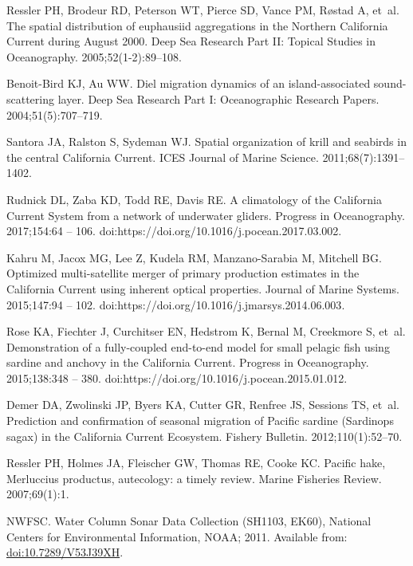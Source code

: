 \documentclass[10pt,letterpaper]{article}
\begin{document}
\begin{thebibliography}{10}
Ressler PH, Brodeur RD, Peterson WT, Pierce SD, Vance PM, R{\o}stad A, et~al.
\newblock The spatial distribution of euphausiid aggregations in the Northern
  California Current during August 2000.
\newblock Deep Sea Research Part II: Topical Studies in Oceanography.
  2005;52(1-2):89--108.

Benoit-Bird KJ, Au WW.
\newblock Diel migration dynamics of an island-associated sound-scattering
  layer.
\newblock Deep Sea Research Part I: Oceanographic Research Papers.
  2004;51(5):707--719.

Santora JA, Ralston S, Sydeman WJ.
\newblock Spatial organization of krill and seabirds in the central California
  Current.
\newblock ICES Journal of Marine Science. 2011;68(7):1391--1402.

Rudnick DL, Zaba KD, Todd RE, Davis RE.
\newblock A climatology of the California Current System from a network of
  underwater gliders.
\newblock Progress in Oceanography. 2017;154:64 -- 106.
\newblock doi:{https://doi.org/10.1016/j.pocean.2017.03.002}.

Kahru M, Jacox MG, Lee Z, Kudela RM, Manzano-Sarabia M, Mitchell BG.
\newblock Optimized multi-satellite merger of primary production estimates in
  the California Current using inherent optical properties.
\newblock Journal of Marine Systems. 2015;147:94 -- 102.
\newblock doi:{https://doi.org/10.1016/j.jmarsys.2014.06.003}.

Rose KA, Fiechter J, Curchitser EN, Hedstrom K, Bernal M, Creekmore S, et~al.
\newblock Demonstration of a fully-coupled end-to-end model for small pelagic
  fish using sardine and anchovy in the California Current.
\newblock Progress in Oceanography. 2015;138:348 -- 380.
\newblock doi:{https://doi.org/10.1016/j.pocean.2015.01.012}.

Demer DA, Zwolinski JP, Byers KA, Cutter GR, Renfree JS, Sessions TS, et~al.
\newblock Prediction and confirmation of seasonal migration of Pacific sardine
  (Sardinops sagax) in the California Current Ecosystem.
\newblock Fishery Bulletin. 2012;110(1):52--70.

Ressler PH, Holmes JA, Fleischer GW, Thomas RE, Cooke KC.
\newblock Pacific hake, Merluccius productus, autecology: a timely review.
\newblock Marine Fisheries Review. 2007;69(1):1.

NWFSC. Water Column Sonar Data Collection (SH1103, EK60), National Centers for
  Environmental Information, NOAA; 2011.
\newblock Available from: \url{doi:10.7289/V53J39XH}.


\end{thebibliography}
\end{document}
